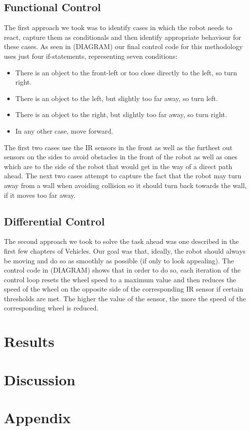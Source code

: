 \documentclass[paper=a4, fontsize=12pt]{scrartcl}	%
\numberwithin{equation}{section}		%
\numberwithin{figure}{section}			%
\numberwithin{table}{section}				%
\begin{document}
\subsection{Functional Control}
The first approach we took was to identify cases in which the robot needs to react, capture them as conditionals and then identify appropriate behaviour for these cases. As seen in (DIAGRAM) our final control code for this methodology uses just four if-statements, representing seven conditions:
\begin{itemize}
 \item There is an object to the front-left or too close directly to the left, so turn right.
 \item There is an object to the left, but slightly too far away, so turn left.
 \item There is an object to the right, but slightly too far away, so turn right.
 \item In any other case, move forward.
\end{itemize}
The first two cases use the IR sensors in the front as well as the furthest out sensors on the sides to avoid obstacles in the front of the robot as well as ones which are to the side of the robot that would get in the way of a direct path ahead. The next two cases attempt to capture the fact that the robot may turn away from a wall when avoiding collision so it should turn back towards the wall, if it moves too far away.
\subsection{Differential Control}
The second approach we took to solve the task ahead was one described in the first few chapters of Vehicles. \cite{1} Our goal was that, ideally, the robot should always be moving and do so as smoothly as possible (if only to look appealing). The control code in (DIAGRAM) shows that in order to do so, each iteration of the control loop resets the wheel speed to a maximum value and then reduces the speed of the wheel on the opposite side of the corresponding IR sensor if certain thresholds are met. The higher the value of the sensor, the more the speed of the corresponding wheel is reduced.
\section{Results}
\section{Discussion}
\section{Appendix}

\end{document}
